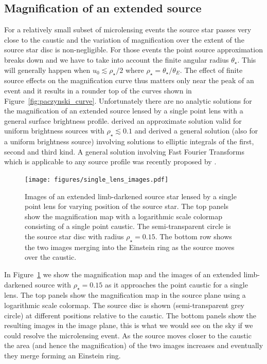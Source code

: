 \documentclass[12pt]{report}
\begin{document}
\subsection{Magnification of an extended source}
For a relatively small subset of microlensing events the source star passes
very close to the caustic and the variation of magnification over the extent of
the source star disc is non-negligible. For those events the point source
approximation breaks down and we have to take into account the finite angular
radius $\theta_\star$. This will generally happen when $u_0 \lesssim
    \rho_\star/2$ \citep{1997ApJ...477..580G} where
$\rho_\star=\theta_\star/\theta_E$. The effect of finite source effects on the
magnification curve thus matters only near the peak of an event and it results
in a rounder top of the curves shown in Figure~\ref{fig:paczynski_curve}.
Unfortunately there are no analytic solutions for the magnification of an
extended source lensed by a single point lens with a general surface brightness
profile. \citet{1994ApJ...421L..71G} derived an approximate solution valid for
uniform brightness sources with $\rho_\star\lesssim 0.1$ and
\citet{1994ApJ...430..505W} derived a general solution (also for a uniform
brightness source) involving solutions to elliptic integrals of the first,
second and third kind. A general solution involving Fast Fourier Transforms
which is applicable to any source profile was recently proposed by
\citet{2022arXiv220306637S}.

\begin{figure}[t]
    \begin{centering}
        \texttt{[image: figures/single\_lens\_images.pdf]}
        \caption{Images of an extended limb-darkened source star lensed by a single
            point lens for varying position of the source star. The top panels show the magnification map with a logarithmic scale
            colormap  consisting of a single point caustic. The semi-transparent circle
            is the source star disc with radius $\rho_\star=0.15$. The bottom row shows
            the two images merging into the Einstein ring as the source moves over the caustic.}
        \label{fig:single_lens_images}
    \end{centering}
\end{figure}

In Figure~\ref{fig:single_lens_images} we show the magnification map and the
images of an extended limb-darkened source with $\rho_\star=0.15$ as it
approaches the point caustic for a single lens. The top panels show the
magnification map in the source plane using a logarithmic scale colormap. The
source disc is shown (semi-transparent grey circle) at different positions
relative to the caustic. The bottom panels show the resulting images in the
image plane, this is what we would see on the sky if we could resolve the
microlensing event. As the source moves closer to the caustic the area (and
hence the magnification) of the two images increases and eventually they merge
forming an Einstein ring.
\end{document}

